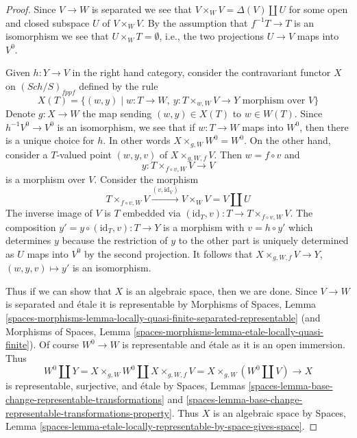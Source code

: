 \documentclass{stacks-project}
\theoremstyle{plain}
\theoremstyle{definition}
\theoremstyle{remark}
\numberwithin{equation}{subsection}
\def\Sch{\mathit{Sch}}
\begin{document}
\begin{proof}
Since $V \to W$ is separated we see that
$V \times_W V = \Delta(V) \amalg U$ for some open and closed subspace
$U$ of $V \times_W V$. By the assumption that $f^{-1}T \to T$ is an
isomorphism we see that $U \times_W T = \emptyset$, i.e., the two
projections $U \to V$ maps into $V^0$.

\medskip\noindent
Given $h : Y \to V$ in the right hand category, consider the
contravariant functor $X$ on $(\Sch/S)_{fppf}$ defined by the rule
$$
X(T) = \{(w, y) \mid
w :  T \to W,\ y : T \times_{w, W} V \to Y\text{ morphism over }V\}
$$
Denote $g : X \to W$ the map sending $(w, y) \in X(T)$ to $w \in W(T)$.
Since $h^{-1}V^0 \to V^0$ is an isomorphism, we see that if
$w : T \to W$ maps into $W^0$, then there is a unique choice for $h$.
In other words $X \times_{g, W} W^0 = W^0$. On the other hand, consider
a $T$-valued point $(w, y, v)$ of $X \times_{g, W, f} V$.
Then $w = f \circ v$ and
$$
y : T \times_{f \circ v, W} V \longrightarrow V
$$
is a morphism over $V$. Consider the morphism
$$
T \times_{f \circ v, W} V \xrightarrow{(v, \text{id}_V)}
V \times_W V = V \amalg U
$$
The inverse image of $V$ is $T$ embedded via
$(\text{id}_T, v) : T \to T \times_{f \circ v, W} V$.
The composition $y' = y \circ (\text{id}_T, v) : T \to Y$
is a morphism with $v = h \circ y'$ which determines $y$ because the
restriction of $y$ to the other part is uniquely determined as
$U$ maps into $V^0$ by the second projection. It follows that
$X \times_{g, W, f} V \to Y$, $(w, y, v) \mapsto y'$ is an isomorphism.

\medskip\noindent
Thus if we can show that $X$ is an algebraic space, then we are done.
Since $V \to W$ is separated and \'etale it is representable by
Morphisms of Spaces, Lemma
\ref{spaces-morphisms-lemma-locally-quasi-finite-separated-representable}
(and Morphisms of Spaces, Lemma
\ref{spaces-morphisms-lemma-etale-locally-quasi-finite}).
Of course $W^0 \to W$ is representable and \'etale as it is an
open immersion. Thus
$$
W^0 \amalg Y = X \times_{g, W} W^0 \amalg X \times_{g, W, f} V
= X \times_{g, W} (W^0 \amalg V) \longrightarrow X
$$
is representable, surjective, and \'etale by Spaces, Lemmas
\ref{spaces-lemma-base-change-representable-transformations} and
\ref{spaces-lemma-base-change-representable-transformations-property}.
Thus $X$ is an algebraic
space by Spaces, Lemma
\ref{spaces-lemma-etale-locally-representable-by-space-gives-space}.
\end{proof}
\end{document}
